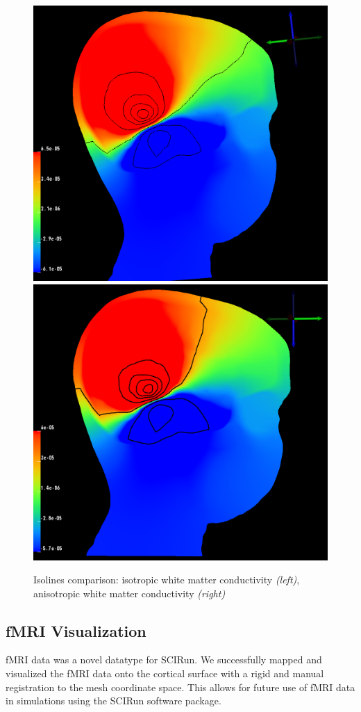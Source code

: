 \begin{figure}[H]
\begin{center}
\includegraphics[width=.49\textwidth]{Figures/iso_isolines}
\includegraphics[width = .49\textwidth]{Figures/aniso_isolines}
\caption{Isolines comparison: isotropic white matter conductivity \textit{(left)}, anisotropic white matter conductivity \textit{(right)}}
\label{fig:isolines}
\end{center}
\end{figure}

\subsection{fMRI Visualization}

fMRI data was a novel datatype for SCIRun. We successfully mapped and visualized the fMRI data onto the cortical surface with a rigid and manual registration to the mesh coordinate space. This allows for future use of fMRI data in simulations using the SCIRun software package.

